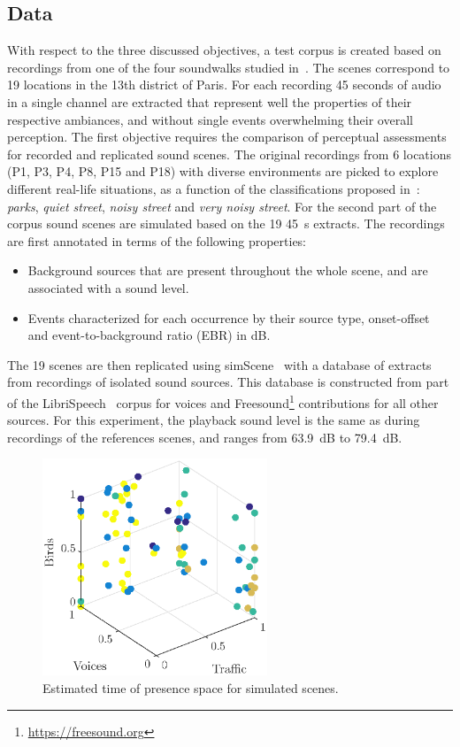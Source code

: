 \documentclass[11pt,a4paper]{article}
\begin{document}
\subsection{Data}
\label{sec:test_data}

With respect to the three discussed objectives, a test corpus is created based on recordings from one of the four soundwalks studied in~\cite{aumond2017}. The scenes correspond to 19 locations in the 13th district of Paris. For each recording 45 seconds of audio in a single channel are extracted that represent well the properties of their respective ambiances, and without single events overwhelming their overall perception.
The first objective requires the comparison of perceptual assessments for recorded and replicated sound scenes. The original recordings from 6 locations (P1, P3, P4, P8, P15 and P18) with diverse environments are picked to explore different real-life situations, as a function of the classifications proposed in~\cite{gloaguen2017}: \textit{parks}, \textit{quiet street}, \textit{noisy street} and \textit{very noisy street}. For the second part of the corpus sound scenes are simulated based on the 19 45~s extracts. The recordings are first annotated in terms of the following properties:

\begin{itemize}
\item Background sources that are present throughout the whole scene, and are associated with a sound level.
\item Events characterized for each occurrence by their source type, onset-offset and event-to-background ratio (EBR) in dB.
\end{itemize}

The 19 scenes are then replicated using simScene~\cite{rossignol2015} with a database of extracts from recordings of isolated sound sources. This database is constructed from part of the LibriSpeech~\cite{panayotov2015} corpus for voices and Freesound\footnote{\url{https://freesound.org}} contributions for all other sources. For this experiment, the playback sound level is the same as during recordings of the references scenes, and ranges from 63.9~dB to 79.4~dB.\\

\begin{figure}[!h]
    \centering
    \includegraphics[width=0.6\textwidth]{figures/tvb_pres.eps}
    \caption{Estimated time of presence space for simulated scenes.}\label{fig:tvb_pres}
\end{figure}
\end{document}
